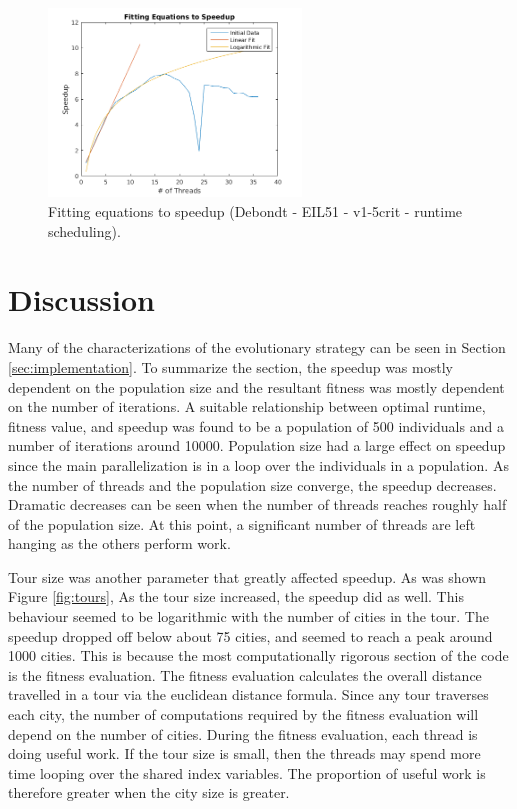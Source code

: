 \documentclass[10pt,letterpaper]{article}
\begin{document}
\begin{figure}
\centering
\includegraphics[width=0.6\textwidth]{../img/Debondt_fitting_v1-5crit_runtimepop.png}
\caption{Fitting equations to speedup (Debondt - EIL51 - v1-5crit - runtime scheduling).}
\label{fig:linefits}
\end{figure}




\newpage
\section{Discussion} \label{sec:discussion}
Many of the characterizations of the evolutionary strategy can be seen in Section \ref{sec:implementation}. To summarize the section, the speedup was mostly dependent on the population size and the resultant fitness was mostly dependent on the number of iterations. A suitable relationship between optimal runtime, fitness value, and speedup was found to be a population of 500 individuals and a number of iterations around 10000. Population size had a large effect on speedup since the main parallelization is in a loop over the individuals in a population. As the number of threads and the population size converge, the speedup decreases. Dramatic decreases can be seen when the number of threads reaches roughly half of the population size. At this point, a significant number of threads are left hanging as the others perform work. 

Tour size was another parameter that greatly affected speedup. As was shown Figure \ref{fig:tours}, As the tour size increased, the speedup did as well. %
This behaviour seemed to be logarithmic with the number of cities in the tour. The speedup dropped off below about 75 cities, and seemed to reach a peak around 1000 cities. This is because the most computationally rigorous section of the code is the fitness evaluation. The fitness evaluation calculates the overall distance travelled in a tour via the euclidean distance formula. Since any tour traverses each city, the number of computations required by the fitness evaluation will depend on the number of cities. During the fitness evaluation, each thread is doing useful work. If the tour size is small, then the threads may spend more time looping over the shared index variables. The proportion of useful work is therefore greater when the city size is greater.
\end{document}
